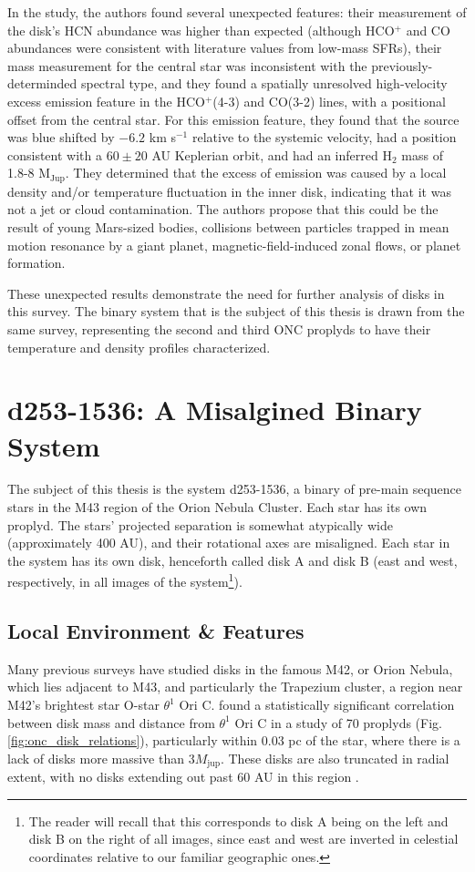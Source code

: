 In the study, the authors found several unexpected features: their measurement of the disk's HCN abundance was higher than expected (although HCO$^+$ and CO abundances were consistent with literature values from low-mass SFRs), their mass measurement for the central star was inconsistent with the previously-determinded spectral type, and they found a spatially unresolved high-velocity excess emission feature in the HCO$^+$(4-3) and CO(3-2) lines, with a positional offset from the central star. For this emission feature, they found that the source was blue shifted by $-6.2$ km s$^{-1}$ relative to the systemic velocity, had a position consistent with a $60\pm20$ AU Keplerian orbit, and had an inferred H$_2$ mass of 1.8-8 M$_\text{Jup}$. They determined that the excess of emission was caused by a local density and/or temperature fluctuation in the inner disk, indicating that it was not a jet or cloud contamination. The authors propose that this could be the result of young Mars-sized bodies, collisions between particles trapped in mean motion resonance by a giant planet, magnetic-field-induced zonal flows, or planet formation.


These unexpected results demonstrate the need for further analysis of disks in this survey. The binary system that is the subject of this thesis is drawn from the same survey, representing the second and third ONC proplyds to have their temperature and density profiles characterized.





\section{d253-1536: A Misalgined Binary System}

The subject of this thesis is the system d253-1536, a binary of pre-main sequence stars in the M43 region of the Orion Nebula Cluster. Each star has its own proplyd. The stars' projected separation is somewhat atypically wide (approximately 400 AU), and their rotational axes are misaligned. Each star in the system has its own disk, henceforth called disk A and disk B (east and west, respectively, in all images of the system\footnote{The reader will recall that this corresponds to disk A being on the left and disk B on the right of all images, since east and west are inverted in celestial coordinates relative to our familiar geographic ones.}).

\subsection{Local Environment \& Features}
Many previous surveys have studied disks in the famous M42, or Orion Nebula, which lies adjacent to M43, and particularly the Trapezium cluster, a region near M42's brightest star O-star $\theta^1$ Ori C. \citet{Mann2014} found a statistically significant correlation between disk mass and distance from $\theta^1$ Ori C in a study of 70 proplyds (Fig. \ref{fig:onc_disk_relations}), particularly within 0.03 pc of the star, where there is a lack of disks more massive than $3 M_\text{jup}$. These disks are also truncated in radial extent, with no disks extending out past 60 AU in this region \citep{Eisner2018}.


